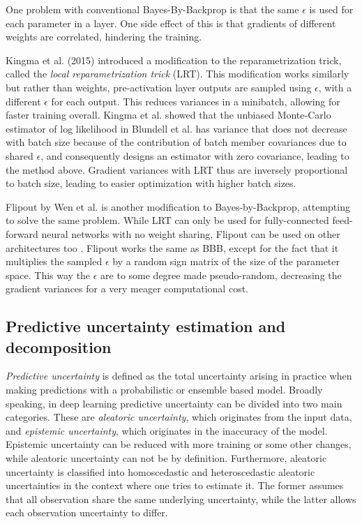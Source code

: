 	One problem with conventional Bayes-By-Backprop is that the same $\epsilon$ is used for each parameter in a layer. One side effect of this is that gradients of different weights are correlated, hindering the training. 
	
	Kingma et al. (2015) \cite{kingma_variational_2015} introduced a modification to the reparametrization trick, called the \textit{local reparametrization trick} (LRT). This modification works similarly but rather than weights, pre-activation layer outputs are sampled using $\epsilon$, with a different $\epsilon$ for each output. This reduces variances in a minibatch, allowing for faster training overall. Kingma et al. showed that the unbiased Monte-Carlo estimator of log likelihood in Blundell et al. has variance that does not decrease with batch size because of the contribution of batch member covariances due to shared $\epsilon$, and consequently designs an estimator with zero covariance, leading to the method above. Gradient variances with LRT thus are inversely proportional to batch size, leading to easier optimization with higher batch sizes. 

	Flipout by Wen et al. \cite{wen_flipout_2018} is another modification to Bayes-by-Backprop, attempting to solve the same problem. While LRT can only be used for fully-connected feed-forward neural networks with no weight sharing, Flipout can be used on other architectures too \cite{wen_flipout_2018}. Flipout works the same as BBB, except for the fact that it multiplies the sampled $\epsilon$ by a random sign matrix of the size of the parameter space. This way the $\epsilon$ are to some degree made pseudo-random, decreasing the gradient variances for a very meager computational cost.
	
\subsection{Predictive uncertainty estimation and decomposition}

\textit{Predictive uncertainty} is defined as the total uncertainty arising in practice when making predictions with a probabilistic or ensemble based model.
Broadly speaking, in deep learning predictive uncertainty can be divided into two main categories. These are  \textit{aleatoric uncertainty}, which originates from the input data, and \textit{epistemic uncertainty}, which originates in the inaccuracy of the model. Epistemic uncertainty can be reduced with more training or some other changes, while aleatoric uncertainty can not be by definition. Furthermore, aleatoric uncertainty is classified into homoscedastic and heteroscedastic aleatoric uncertainties in the context where one tries to estimate it. The former assumes that all observation share the same underlying uncertainty, while the latter allows each observation uncertainty to differ. \cite{shridhar_comprehensive_2019}

